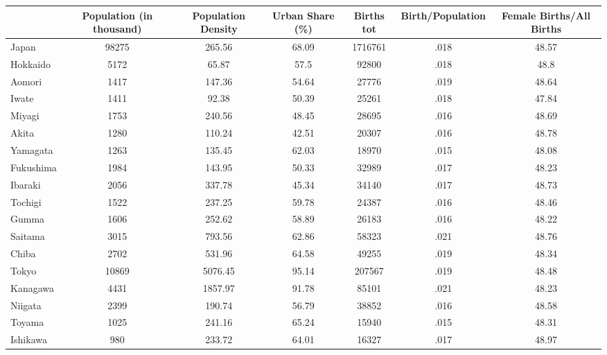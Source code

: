 \begin{tabular}{l*{6}{c}}
\hline\hline
            &Population (in thousand)&Population Density&Urban Share (\%)&  Births tot&Birth/Population&Female Births/All Births\\
\hline
Japan       &       98275&      265.56&       68.09&     1716761&        .018&       48.57\\
Hokkaido    &        5172&       65.87&        57.5&       92800&        .018&        48.8\\
Aomori      &        1417&      147.36&       54.64&       27776&        .019&       48.64\\
Iwate       &        1411&       92.38&       50.39&       25261&        .018&       47.84\\
Miyagi      &        1753&      240.56&       48.45&       28695&        .016&       48.69\\
Akita       &        1280&      110.24&       42.51&       20307&        .016&       48.78\\
Yamagata    &        1263&      135.45&       62.03&       18970&        .015&       48.08\\
Fukushima   &        1984&      143.95&       50.33&       32989&        .017&       48.23\\
Ibaraki     &        2056&      337.78&       45.34&       34140&        .017&       48.73\\
Tochigi     &        1522&      237.25&       59.78&       24387&        .016&       48.46\\
Gumma       &        1606&      252.62&       58.89&       26183&        .016&       48.22\\
Saitama     &        3015&      793.56&       62.86&       58323&        .021&       48.76\\
Chiba       &        2702&      531.96&       64.58&       49255&        .019&       48.34\\
Tokyo       &       10869&     5076.45&       95.14&      207567&        .019&       48.48\\
Kanagawa    &        4431&     1857.97&       91.78&       85101&        .021&       48.23\\
Niigata     &        2399&      190.74&       56.79&       38852&        .016&       48.58\\
Toyama      &        1025&      241.16&       65.24&       15940&        .015&       48.31\\
Ishikawa    &         980&      233.72&       64.01&       16327&        .017&       48.97\\

\end{tabular}
